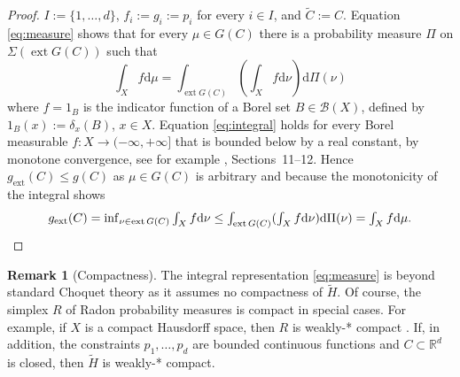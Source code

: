 \documentclass[a4paper,11pt,reqno]{amsart}
\numberwithin{equation}{section}
\theoremstyle{plain}
\theoremstyle{definition}
\newtheorem{remark}[theorem]{Remark}
\newcommand{\cB}{\mathcal{B}} %
\newcommand{\dd}{\mathrm{d}} %
\newcommand{\R}{\mathbb{R}} %
\DeclareMathOperator{\ext}{ext} %
\newcommand\extt{\mathrm{ext}}
\begin{document}
\begin{proof}
$I:=\{1,\dots,d\}$, $f_i:=g_i:=p_i$ for every $i\in I$, and $\tilde C:=C$. Equation 
\eqref{eq:measure} shows that for every $\mu\in G(C)$ there is a probability measure 
$\Pi$ on $\Sigma(\ext G(C))$ such that 
\begin{equation}\label{eq:integral}\textstyle
\int_X f\dd\mu=\int_{\ext G(C)}(\int_X f\dd\nu)\dd\Pi(\nu)
\end{equation}
where $f=1_B$ is the indicator function of a Borel set $B\in\cB(X)$, defined by 
$1_B(x):=\delta_x(B)$, $x\in X$. Equation \eqref{eq:integral} holds for every Borel 
measurable $f\colon X\to(-\infty,+\infty]$ that is bounded below by a real constant, 
by monotone convergence, see for example \cite{bauer01}, Sections~11--12. Hence 
$g_\extt(C)\leq g(C)$ as $\mu\in G(C)$ is arbitrary and because the monotonicity of 
the integral shows
\[\textstyle
g_\extt(C)
=\inf_{\nu\in\ext G(C)}\int_X f\dd\nu
\leq \int_{\ext G(C)}(\int_X f\dd\nu)\dd\Pi(\nu)
= \int_X f\dd\mu.
\qedhere
\]
\end{proof}
%
\begin{remark}[Compactness]\label{rem:no-compactness}
The integral representation \eqref{eq:measure} is beyond standard Choquet theory \cite{phelps01} 
as it assumes no compactness of $\tilde H$. Of course, the simplex $R$ of Radon probability 
measures is compact in special cases. For example, if $X$ is a compact Hausdorff space, then 
$R$ is weakly-* compact \cite[Corollary~13 in Chapter~21]{royden-fitzpatrick10}. If, in addition, 
the constraints $p_1,\dots,p_d$ are bounded continuous functions and $C\subset\R^d$ is closed, 
then $\tilde H$ is weakly-* compact.
\end{remark}
%
\end{document}

